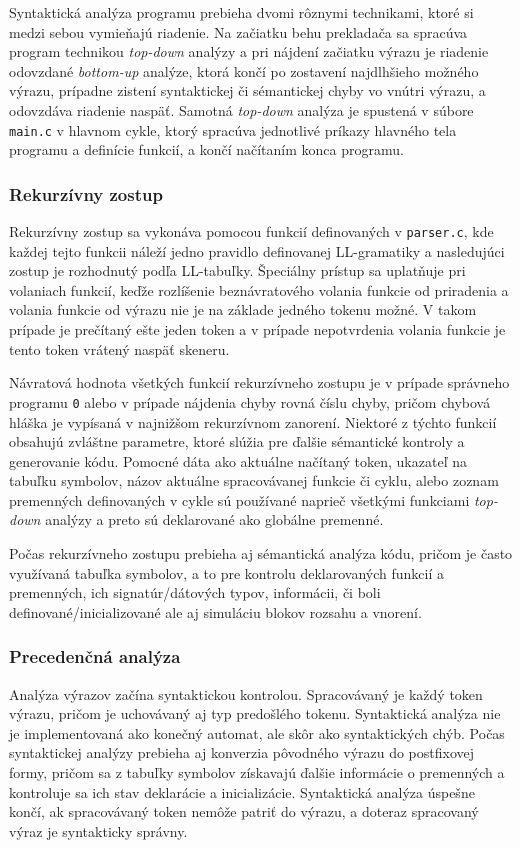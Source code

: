 \documentclass[a4paper,11pt]{article}
\begin{document}
Syntaktická analýza programu prebieha dvomi rôznymi technikami, ktoré si medzi sebou vymieňajú riadenie. Na začiatku behu prekladača sa spracúva program technikou \textit{top-down} analýzy a pri nájdení začiatku výrazu je riadenie odovzdané \textit{bottom-up} analýze, ktorá končí po zostavení najdlhšieho možného výrazu, prípadne zistení syntaktickej či sémantickej chyby vo vnútri výrazu, a odovzdáva riadenie naspäť. Samotná \textit{top-down} analýza je spustená v súbore \texttt{main.c} v hlavnom cykle, ktorý spracúva jednotlivé príkazy hlavného tela programu a definície funkcií, a končí načítaním konca programu.


\subsubsection{Rekurzívny zostup}
Rekurzívny zostup sa vykonáva pomocou funkcií definovaných v \texttt{parser.c}, kde každej tejto funkcii náleží jedno pravidlo definovanej LL-gramatiky a nasledujúci zostup je rozhodnutý podľa LL-tabuľky. Špeciálny prístup sa uplatňuje pri volaniach funkcií, keďže rozlíšenie beznávratového volania funkcie od priradenia a volania funkcie od výrazu nie je na základe jedného tokenu možné. V takom prípade je prečítaný ešte jeden token a v prípade nepotvrdenia volania funkcie je tento token vrátený naspäť skeneru.

	Návratová hodnota všetkých funkcií rekurzívneho zostupu je v prípade správneho programu \texttt{0} alebo v prípade nájdenia chyby rovná číslu chyby, pričom chybová hláška je vypísaná v najnižšom rekurzívnom zanorení. Niektoré z týchto funkcií obsahujú zvláštne parametre, ktoré slúžia pre ďalšie sémantické kontroly a generovanie kódu. Pomocné dáta ako aktuálne načítaný token, ukazateľ na tabuľku symbolov, názov aktuálne spracovávanej funkcie či cyklu, alebo zoznam premenných definovaných v cykle sú používané naprieč všetkými funkciami \textit{top-down} analýzy a preto sú deklarované ako globálne premenné.
	
 Počas rekurzívneho zostupu prebieha aj sémantická analýza kódu, pričom je často využívaná tabuľka symbolov, a to pre kontrolu deklarovaných funkcií a premenných, ich signatúr/dátových typov, informácii, či boli definované/inicializované ale aj simuláciu blokov rozsahu a vnorení.

\subsubsection{Precedenčná analýza}
Analýza výrazov začína syntaktickou kontrolou. Spracovávaný je každý token výrazu, pričom je uchovávaný aj typ predošlého tokenu. Syntaktická analýza nie je implementovaná ako konečný automat, ale skôr ako  syntaktických chýb. Počas syntaktickej analýzy prebieha aj konverzia pôvodného výrazu do postfixovej formy, pričom sa z tabuľky symbolov získavajú ďalšie informácie o premenných a kontroluje sa ich stav deklarácie a inicializácie. Syntaktická analýza úspešne končí, ak spracovávaný token nemôže patriť do výrazu, a doteraz spracovaný výraz je syntakticky správny.
\end{document}
